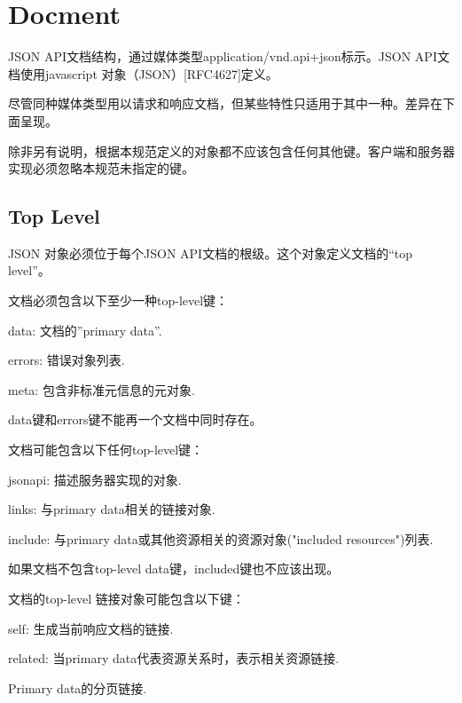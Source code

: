\section{Docment}


JSON API文档结构，通过媒体类型application/vnd.api+json标示。JSON API文档使用javascript 对象（JSON）[RFC4627]定义。

尽管同种媒体类型用以请求和响应文档，但某些特性只适用于其中一种。差异在下面呈现。

除非另有说明，根据本规范定义的对象都不应该包含任何其他键。客户端和服务器实现必须忽略本规范未指定的键。

\subsection{Top Level}

JSON 对象必须位于每个JSON API文档的根级。这个对象定义文档的“top level”。

文档必须包含以下至少一种top-level键：


\begin{compactitem}
\item data: 文档的”primary data”.
\item errors: 错误对象列表.
\item meta: 包含非标准元信息的元对象.
\end{compactitem}

data键和errors键不能再一个文档中同时存在。

文档可能包含以下任何top-level键：

\begin{compactitem}
\item jsonapi: 描述服务器实现的对象.
\item links: 与primary data相关的链接对象.
\item include: 与primary data或其他资源相关的资源对象("included resources")列表.
\end{compactitem}

如果文档不包含top-level data键，included键也不应该出现。

文档的top-level 链接对象可能包含以下键：


\begin{compactitem}
\item self: 生成当前响应文档的链接.
\item related: 当primary data代表资源关系时，表示相关资源链接.
\item Primary data的分页链接.
\end{compactitem}

